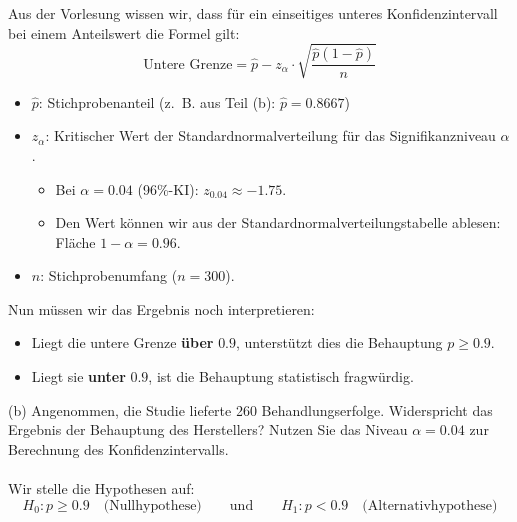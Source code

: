 \documentclass[a4paper]{article}
\begin{document}
Aus der Vorlesung wissen wir, dass für ein einseitiges unteres Konfidenzintervall bei einem Anteilswert die Formel gilt:
\[
\text{Untere Grenze} = \hat{p} - z_{\alpha} \cdot \sqrt{\frac{\hat{p}(1 - \hat{p})}{n}}
\]
\begin{itemize}
    \item \(\hat{p}\): Stichprobenanteil (z.~B. aus Teil (b): \( \hat{p} = 0.8667 \))
    \item \( z_{\alpha} \): Kritischer Wert der Standardnormalverteilung für das Signifikanzniveau \( \alpha \). 
      \begin{itemize}
          \item Bei \( \alpha = 0.04 \) (96\%-KI): \( z_{0.04} \approx -1.75 \).
          \item Den Wert können wir aus der Standardnormalverteilungstabelle ablesen: Fläche \( 1 - \alpha = 0.96 \).
      \end{itemize}
    \item \( n \): Stichprobenumfang (\( n = 300 \)).
\end{itemize}
Nun müssen wir das Ergebnis noch interpretieren:
\begin{itemize}
    \item Liegt die untere Grenze \textbf{über} \( 0.9 \), unterstützt dies die Behauptung \( p \geq 0.9 \).
    \item Liegt sie \textbf{unter} \( 0.9 \), ist die Behauptung statistisch fragwürdig.
\end{itemize}
(b) Angenommen, die Studie lieferte 260 Behandlungserfolge. Widerspricht das Ergebnis der Behauptung des Herstellers? Nutzen Sie das Niveau $\alpha = 0.04$ zur Berechnung des Konfidenzintervalls.\\\\
Wir stelle die Hypothesen auf:
\[
H_0: p \geq 0.9 \quad \text{(Nullhypothese)} \qquad \text{und} \qquad H_1: p < 0.9 \quad \text{(Alternativhypothese)}
\]
\end{document}
